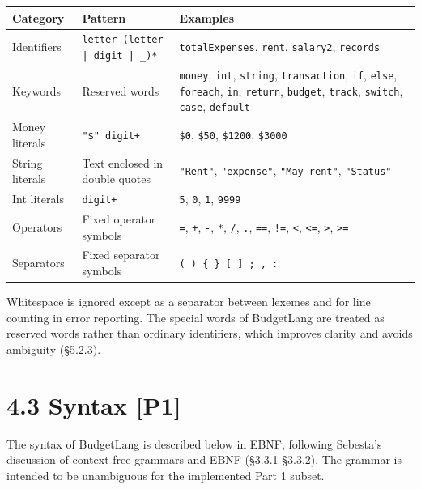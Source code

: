 \documentclass[11pt]{article}
\begin{document}
\begin{table}[h]
\small
\renewcommand{\arraystretch}{1.45}
\begin{tabularx}{\textwidth}{>{\raggedright\arraybackslash}p{} >{\raggedright\arraybackslash}p{} >{\raggedright\arraybackslash}X}
\toprule
\textbf{Category} & \textbf{Pattern} & \textbf{Examples} \\
\midrule
Identifiers & \mbox{\texttt{letter (letter | digit | \_)*}} & \texttt{totalExpenses}, \texttt{rent}, \texttt{salary2}, \texttt{records} \\
Keywords & Reserved words & \texttt{money}, \texttt{int}, \texttt{string}, \texttt{transaction}, \texttt{if}, \texttt{else}, \texttt{foreach}, \texttt{in}, \texttt{return}, \texttt{budget}, \texttt{track}, \texttt{switch}, \texttt{case}, \texttt{default} \\
Money literals & \texttt{"\$" digit+} & \texttt{\$0}, \texttt{\$50}, \texttt{\$1200}, \texttt{\$3000} \\
String literals & Text enclosed in double quotes & \texttt{"Rent"}, \texttt{"expense"}, \texttt{"May rent"}, \texttt{"Status"} \\
Int literals & \texttt{digit+} & \texttt{5}, \texttt{0}, \texttt{1}, \texttt{9999} \\
Operators & Fixed operator symbols & \texttt{=}, \texttt{+}, \texttt{-}, \texttt{*}, \texttt{/}, \texttt{.}, \texttt{==}, \texttt{!=}, \texttt{<}, \texttt{<=}, \texttt{>}, \texttt{>=} \\
Separators & Fixed separator symbols & \texttt{( ) \{ \} [ ] ; , :} \\
\bottomrule
\end{tabularx}
\end{table}

Whitespace is ignored except as a separator between lexemes and for line counting in error reporting. The special words of BudgetLang are treated as reserved words rather than ordinary identifiers, which improves clarity and avoids ambiguity (\S5.2.3).

\section*{4.3 Syntax [P1]}
The syntax of BudgetLang is described below in EBNF, following Sebesta's discussion of context-free grammars and EBNF (\S3.3.1-\S3.3.2). The grammar is intended to be unambiguous for the implemented Part 1 subset.
\end{document}
